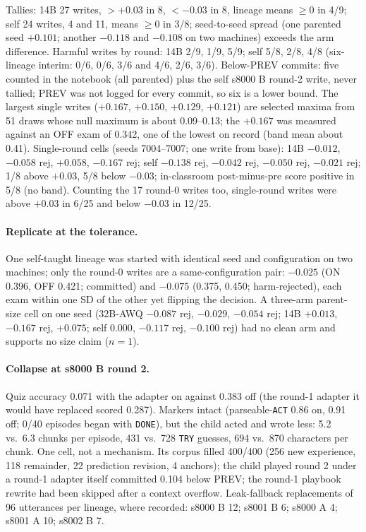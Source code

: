 \documentclass{article}
\begin{document}
Tallies: 14B 27 writes, $>+0.03$ in 8, $<-0.03$ in 8, lineage means $\ge 0$ in 4/9; self 24 writes, 4 and 11, means $\ge 0$ in 3/8; seed-to-seed spread (one parented seed $+0.101$; another $-0.118$ and $-0.108$ on two machines) exceeds the arm difference. Harmful writes by round: 14B 2/9, 1/9, 5/9; self 5/8, 2/8, 4/8 (six-lineage interim: 0/6, 0/6, 3/6 and 4/6, 2/6, 3/6). Below-PREV commits: five counted in the notebook (all parented) plus the self s8000 B round-2 write, never tallied; PREV was not logged for every commit, so six is a lower bound. The largest single writes ($+0.167$, $+0.150$, $+0.129$, $+0.121$) are selected maxima from 51 draws whose null maximum is about 0.09--0.13; the $+0.167$ was measured against an OFF exam of 0.342, one of the lowest on record (band mean about 0.41). Single-round cells (seeds 7004--7007; one write from base): 14B $-0.012$, $-0.058$ rej, $+0.058$, $-0.167$ rej; self $-0.138$ rej, $-0.042$ rej, $-0.050$ rej, $-0.021$ rej; 1/8 above $+0.03$, 5/8 below $-0.03$; in-classroom post-minus-pre score positive in 5/8 (no band). Counting the 17 round-0 writes too, single-round writes were above $+0.03$ in 6/25 and below $-0.03$ in 12/25.

\paragraph{Replicate at the tolerance.} One self-taught lineage was started with identical seed and configuration on two machines; only the round-0 writes are a same-configuration pair: $-0.025$ (ON 0.396, OFF 0.421; committed) and $-0.075$ (0.375, 0.450; harm-rejected), each exam within one SD of the other yet flipping the decision. A three-arm parent-size cell on one seed (32B-AWQ $-0.087$ rej, $-0.029$, $-0.054$ rej; 14B $+0.013$, $-0.167$ rej, $+0.075$; self $0.000$, $-0.117$ rej, $-0.100$ rej) had no clean arm and supports no size claim ($n = 1$).

\paragraph{Collapse at s8000 B round 2.} Quiz accuracy 0.071 with the adapter on against 0.383 off (the round-1 adapter it would have replaced scored 0.287). Markers intact (parseable-\texttt{ACT} 0.86 on, 0.91 off; 0/40 episodes began with \texttt{DONE}), but the child acted and wrote less: 5.2 vs.\ 6.3 chunks per episode, 431 vs.\ 728 \texttt{TRY} guesses, 694 vs.\ 870 characters per chunk. One cell, not a mechanism. Its corpus filled 400/400 (256 new experience, 118 remainder, 22 prediction revision, 4 anchors); the child played round 2 under a round-1 adapter itself committed 0.104 below PREV; the round-1 playbook rewrite had been skipped after a context overflow. Leak-fallback replacements of 96 utterances per lineage, where recorded: s8000 B 12; s8001 B 6; s8000 A 4; s8001 A 10; s8002 B 7.
\end{document}

